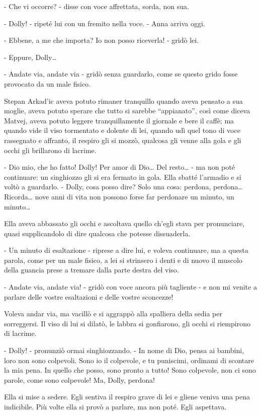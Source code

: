 - Che vi occorre? - disse con voce affrettata, sorda, non sua. 

- Dolly! - ripeté lui con un fremito nella voce. - Anna arriva oggi. 

- Ebbene, a me che importa? Io non posso riceverla! - gridò lei. 

- Eppure, Dolly\ldots{} 

- Andate via, andate via - gridò senza guardarlo, come se questo grido fosse provocato da un male fisico. 

Stepan Arkad'ic aveva potuto rimaner tranquillo quando aveva pensato a sua moglie, aveva potuto sperare che tutto si sarebbe ``appianato'', così come diceva Matvej, aveva potuto leggere tranquillamente il giornale e bere il caffè; ma quando vide il viso tormentato e dolente di lei, quando udì quel tono di voce rassegnato e affranto, il respiro gli si mozzò, qualcosa gli venne alla gola e gli occhi gli brillarono di lacrime. 

- Dio mio, che ho fatto! Dolly! Per amor di Dio\ldots{} Del resto\ldots{} - ma non poté continuare: un singhiozzo gli si era fermato in gola. Ella sbatté l'armadio e si voltò a guardarlo. - Dolly, cosa posso dire? Solo una cosa: perdona, perdona\ldots{} Ricorda\ldots{} nove anni di vita non possono forse far perdonare un minuto, un minuto\ldots{} 

Ella aveva abbassato gli occhi e ascoltava quello ch'egli stava per pronunciare, quasi supplicandolo di dire qualcosa che potesse dissuaderla. 

- Un minuto di esaltazione - riprese a dire lui, e voleva continuare, ma a questa parola, come per un male fisico, a lei si strinsero i denti e di nuovo il muscolo della guancia prese a tremare dalla parte destra del viso. 

- Andate via, andate via! - gridò con voce ancora più tagliente - e non mi venite a parlare delle vostre esaltazioni e delle vostre sconcezze! 

Voleva andar via, ma vacillò e si aggrappò alla spalliera della sedia per sorreggersi. Il viso di lui si dilatò, le labbra si gonfiarono, gli occhi si riempirono di lacrime. 

- Dolly! - pronunziò ormai singhiozzando. - In nome di Dio, pensa ai bambini, loro non sono colpevoli. Sono io il colpevole, e tu puniscimi, ordinami di scontare la mia pena. In quello che posso, sono pronto a tutto! Sono colpevole, non ci sono parole, come sono colpevole! Ma, Dolly, perdona! 

Ella si mise a sedere. Egli sentiva il respiro grave di lei e gliene veniva una pena indicibile. Più volte ella si provò a parlare, ma non poté. Egli aspettava. 

